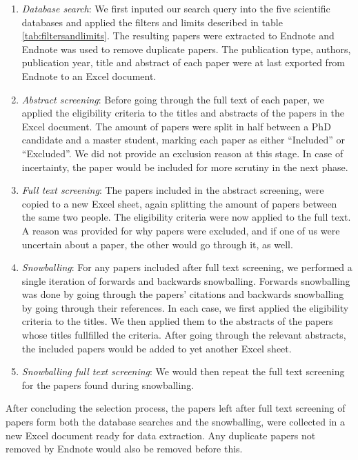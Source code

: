 \begin{enumerate}
    \item \textit{Database search}: We first inputed our search query into the five scientific databases and applied the filters and limits described in table \ref{tab:filtersandlimits}. The resulting papers were extracted to Endnote and Endnote was used to remove duplicate papers. The publication type, authors, publication year, title and abstract of each paper were at last exported from Endnote to an Excel document.
    \item \textit{Abstract screening}: Before going through the full text of each paper, we applied the eligibility criteria to the titles and abstracts of the papers in the Excel document. The amount of papers were split in half between a PhD candidate and a master student, marking each paper as either ``Included'' or ``Excluded''. We did not provide an exclusion reason at this stage. In case of incertainty, the paper would be included for more scrutiny in the next phase.
    \item \textit{Full text screening}: The papers included in the abstract screening, were copied to a new Excel sheet, again splitting the amount of papers between the same two people. The eligibility criteria were now applied to the full text. A reason was provided for why papers were excluded, and if one of us were uncertain about a paper, the other would go through it, as well.
    \item \textit{Snowballing}: For any papers included after full text screening, we performed a single iteration of forwards and backwards snowballing. Forwards snowballing was done by going through the papers' citations and backwards snowballing by going through their references. In each case, we first applied the eligibility criteria to the titles. We then applied them to the abstracts of the papers whose titles fullfilled the criteria. After going through the relevant abstracts, the included papers would be added to yet another Excel sheet.
    \item \textit{Snowballing full text screening}: We would then repeat the full text screening for the papers found during snowballing.
\end{enumerate}

After concluding the selection process, the papers left after full text screening of papers form both the database searches and the snowballing, were collected in a new Excel document ready for data extraction. Any duplicate papers not removed by Endnote would also be removed before this.

